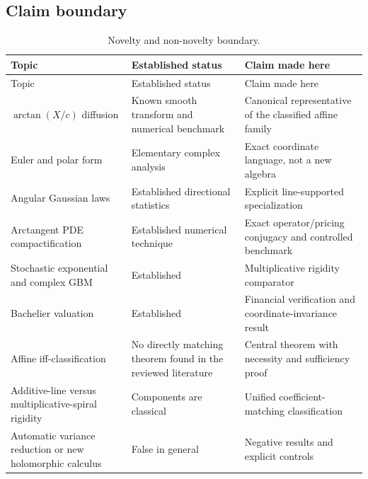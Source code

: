\documentclass[
  english,
  10pt,
  letterpaper,
  DIV=11,
  numbers=noendperiod]{scrartcl}
\theoremstyle{definition}
\theoremstyle{plain}
\theoremstyle{plain}
\theoremstyle{remark}
\begin{document}
\subsection{Claim boundary}\label{claim-boundary}

\begin{longtable}[]{@{}
  >{\raggedright\arraybackslash}p{}
  >{\raggedright\arraybackslash}p{}
  >{\raggedright\arraybackslash}p{}@{}}
\caption{Novelty and non-novelty
boundary.}\label{tbl-novelty-boundary}\tabularnewline
\toprule\noalign{}
\begin{minipage}[b]{\linewidth}\raggedright
Topic
\end{minipage} & \begin{minipage}[b]{\linewidth}\raggedright
Established status
\end{minipage} & \begin{minipage}[b]{\linewidth}\raggedright
Claim made here
\end{minipage} \\
\midrule\noalign{}
\endfirsthead
\toprule\noalign{}
\begin{minipage}[b]{\linewidth}\raggedright
Topic
\end{minipage} & \begin{minipage}[b]{\linewidth}\raggedright
Established status
\end{minipage} & \begin{minipage}[b]{\linewidth}\raggedright
Claim made here
\end{minipage} \\
\midrule\noalign{}
\endhead
\bottomrule\noalign{}
\endlastfoot
\(\arctan(X/c)\) diffusion & Known smooth transform and numerical
benchmark & Canonical representative of the classified affine family \\
Euler and polar form & Elementary complex analysis & Exact coordinate
language, not a new algebra \\
Angular Gaussian laws & Established directional statistics & Explicit
line-supported specialization \\
Arctangent PDE compactification & Established numerical technique &
Exact operator/pricing conjugacy and controlled benchmark \\
Stochastic exponential and complex GBM & Established & Multiplicative
rigidity comparator \\
Bachelier valuation & Established & Financial verification and
coordinate-invariance result \\
Affine iff-classification & No directly matching theorem found in the
reviewed literature & Central theorem with necessity and sufficiency
proof \\
Additive-line versus multiplicative-spiral rigidity & Components are
classical & Unified coefficient-matching classification \\
Automatic variance reduction or new holomorphic calculus & False in
general & Negative results and explicit controls \\
\end{longtable}
\end{document}
